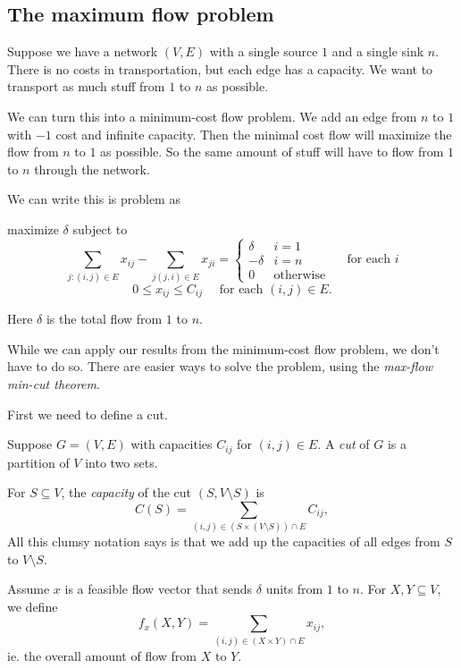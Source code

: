 \documentclass[a4paper]{article}
\begin{document}
\subsection{The maximum flow problem}
Suppose we have a network $(V, E)$ with a single source $1$ and a single sink $n$. There is no costs in transportation, but each edge has a capacity. We want to transport as much stuff from $1$ to $n$ as possible.

We can turn this into a minimum-cost flow problem. We add an edge from $n$ to $1$ with $-1$ cost and infinite capacity. Then the minimal cost flow will maximize the flow from $n$ to $1$ as possible. So the same amount of stuff will have to flow from $1$ to $n$ through the network.

We can write this is problem as
\begin{center}
  maximize $\delta$ subject to
  \[
    \sum_{j: (i, j) \in E}x_{ij} - \sum_{j(j, i)\in E}x_{ji} =
    \begin{cases}
      \delta & i = 1\\
      -\delta & i = n\\
      0&\text{otherwise}
    \end{cases}\quad\text{ for each }i
  \]
  \[
    0 \leq x_{ij}\leq C_{ij}\quad \text{ for each }(i, j)\in E.
  \]
\end{center}
Here $\delta$ is the total flow from $1$ to $n$.

While we can apply our results from the minimum-cost flow problem, we don't have to do so. There are easier ways to solve the problem, using the \emph{max-flow min-cut theorem}.

First we need to define a cut.
\begin{defi}[Cut]
  Suppose $G = (V, E)$ with capacities $C_{ij}$ for $(i, j)\in E$. A \emph{cut} of $G$ is a partition of $V$ into two sets.

  For $S\subseteq V$, the \emph{capacity} of the cut $(S, V\setminus S)$ is
  \[
    C(S) = \sum_{(i, j)\in (S\times (V\setminus S))\cap E}C_{ij},
  \]
  All this clumsy notation says is that we add up the capacities of all edges from $S$ to $V\setminus S$.
\end{defi}

Assume $x$ is a feasible flow vector that sends $\delta$ units from $1$ to $n$. For $X, Y\subseteq V$, we define
\[
  f_x(X, Y) = \sum_{(i, j)\in (X\times Y)\cap E}x_{ij},
\]
ie. the overall amount of flow from $X$ to $Y$.
\end{document}
